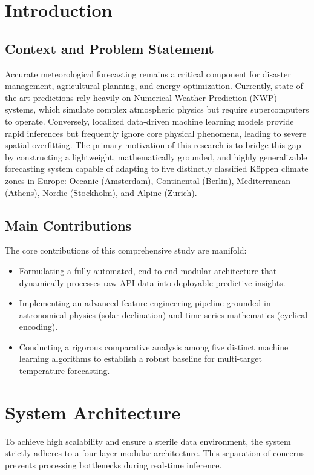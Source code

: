 \documentclass[runningheads]{llncs}
\begin{document}
\section{Introduction}

\subsection{Context and Problem Statement}
Accurate meteorological forecasting remains a critical component for disaster management, agricultural planning, and energy optimization. Currently, state-of-the-art predictions rely heavily on Numerical Weather Prediction (NWP) systems, which simulate complex atmospheric physics but require supercomputers to operate. Conversely, localized data-driven machine learning models provide rapid inferences but frequently ignore core physical phenomena, leading to severe spatial overfitting. The primary motivation of this research is to bridge this gap by constructing a lightweight, mathematically grounded, and highly generalizable forecasting system capable of adapting to five distinctly classified Köppen climate zones in Europe: Oceanic (Amsterdam), Continental (Berlin), Mediterranean (Athens), Nordic (Stockholm), and Alpine (Zurich).

\subsection{Main Contributions}
The core contributions of this comprehensive study are manifold:
\begin{itemize}
    \item Formulating a fully automated, end-to-end modular architecture that dynamically processes raw API data into deployable predictive insights.
    \item Implementing an advanced feature engineering pipeline grounded in astronomical physics (solar declination) and time-series mathematics (cyclical encoding).
    \item Conducting a rigorous comparative analysis among five distinct machine learning algorithms to establish a robust baseline for multi-target temperature forecasting.
\end{itemize}

\section{System Architecture}
To achieve high scalability and ensure a sterile data environment, the system strictly adheres to a four-layer modular architecture. This separation of concerns prevents processing bottlenecks during real-time inference.
\end{document}
